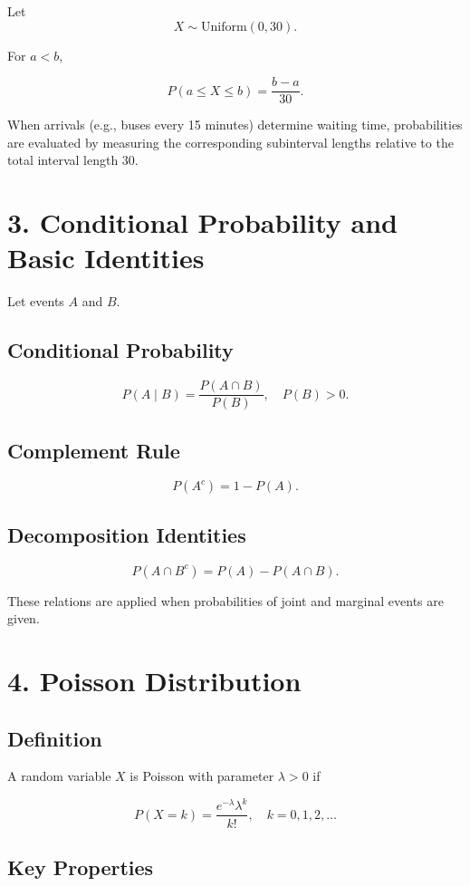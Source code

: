 \documentclass[12pt]{article}
\begin{document}
Let 
\[
X \sim \text{Uniform}(0,30).
\]

For $a < b$,

\[
P(a \le X \le b) = \frac{b - a}{30}.
\]

When arrivals (e.g., buses every 15 minutes) determine waiting time, probabilities are evaluated by measuring the corresponding subinterval lengths relative to the total interval length 30.

\section*{3. Conditional Probability and Basic Identities}

Let events $A$ and $B$.

\subsection*{Conditional Probability}

\[
P(A \mid B) = \frac{P(A \cap B)}{P(B)}, \quad P(B) > 0.
\]

\subsection*{Complement Rule}

\[
P(A^c) = 1 - P(A).
\]

\subsection*{Decomposition Identities}

\[
P(A \cap B^c) = P(A) - P(A \cap B).
\]

These relations are applied when probabilities of joint and marginal events are given.

\section*{4. Poisson Distribution}

\subsection*{Definition}

A random variable $X$ is Poisson with parameter $\lambda > 0$ if

\[
P(X = k) = \frac{e^{-\lambda} \lambda^k}{k!}, \quad k = 0,1,2,\dots
\]

\subsection*{Key Properties}
\end{document}
